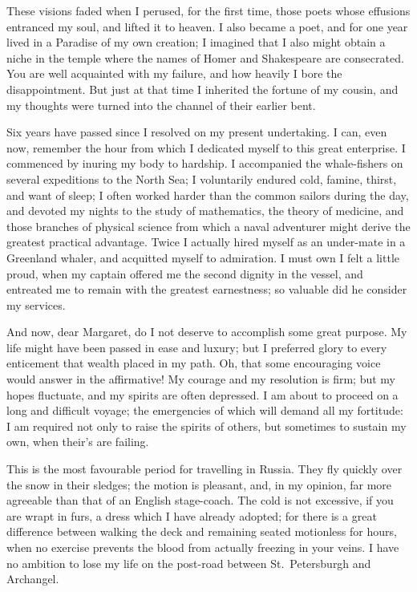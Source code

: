 These visions faded when I perused,
for the first time, those poets whose
effusions entranced my soul, and lifted
it to heaven. I also became a poet,
and for one year lived in a Paradise of
my own creation; I imagined that I
also might obtain a niche in the temple
where the names of Homer and Shakespeare
are consecrated. You are well
acquainted with my failure, and how
heavily I bore the disappointment.
But just at that time I inherited the
fortune of my cousin, and my thoughts
were turned into the channel of their
earlier bent.

Six years have passed since I resolved
on my present undertaking. I can, even
now, remember the hour from which I
dedicated myself to this great enterprise.
I commenced by inuring my body to
hardship. I accompanied the whale-fishers
on several expeditions to the
North Sea; I voluntarily endured cold,
famine, thirst, and want of sleep; I
often worked harder than the common
sailors during the day, and devoted my
nights to the study of mathematics,
the theory of medicine, and those
branches of physical science from
which a naval adventurer might derive
the greatest practical advantage. Twice
I actually hired myself as an under-mate
in a Greenland whaler, and acquitted
myself to admiration. I must
own I felt a little proud, when my captain
offered me the second dignity in
the vessel, and entreated me to remain
with the greatest earnestness; so valuable
did he consider my services.

And now, dear Margaret, do I not
deserve to accomplish some great purpose.
My life might have been passed
in ease and luxury; but I preferred
glory to every enticement that wealth
placed in my path. Oh, that some encouraging
voice would answer in the
affirmative! My courage and my resolution
is firm; but my hopes fluctuate,
and my spirits are often depressed. I
am about to proceed on a long and difficult
voyage; the emergencies of which
will demand all my fortitude: I am required
not only to raise the spirits of
others, but sometimes to sustain my
own, when their's are failing.

This is the most favourable period
for travelling in Russia. They fly
quickly over the snow in their sledges;
the motion is pleasant, and, in my opinion,
far more agreeable than that of an
English stage-coach. The cold is not
excessive, if you are wrapt in furs, a
dress which I have already adopted;
for there is a great difference between
walking the deck and remaining seated
motionless for hours, when no exercise
prevents the blood from actually freezing
in your veins. I have no ambition
to lose my life on the post-road between
St.~Petersburgh and Archangel.

